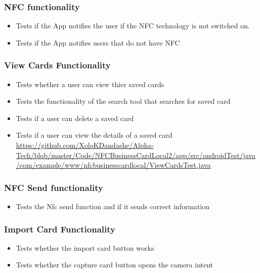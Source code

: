 \documentclass[english]{article}
\begin{document}
		\subsubsection{NFC functionality}
		\begin{itemize} 
			\item Tests if the App notifies the user if the NFC technology is not switched on.
			\item Tests if the App notifies users that do not have NFC
\\
					\href{url}{}
			
		\end{itemize}
		\subsubsection{View Cards Functionality}
		\begin{itemize}
			\item Tests whether a user can view thier saved cards
			\item Tests the functionality of the search tool that searches for saved card
			\item Tests if a user can delete a saved card
			\item Tests if a user can view the details of a saved card
\\
					\href{url}{https://github.com/XoloKDandashe/Alpha-Tech/blob/master/Code/NFCBusinessCardLocal2/app/src/androidTest/java/com/example/www/nfcbusinesscardlocal/ViewCardsTest.java}
		\end{itemize}
		\subsubsection{NFC Send functionality}
		\begin{itemize} 
			\item Tests the Nfc send function and if it sends correct information
\\
					\href{url}{}
		\end{itemize}

		\subsubsection{Import Card Functionality}
		\begin{itemize}
			\item Tests whether the import card button works
			\item Tests whether the capture card button opens the camera intent
\\
					\href{url}{}
		\end{itemize}
\end{document}
